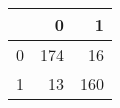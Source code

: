 \begin{tabular}{lrr}
\toprule
{} &    0 &    1 \\
\midrule
0 &  174 &   16 \\
1 &   13 &  160 \\
\bottomrule
\end{tabular}
